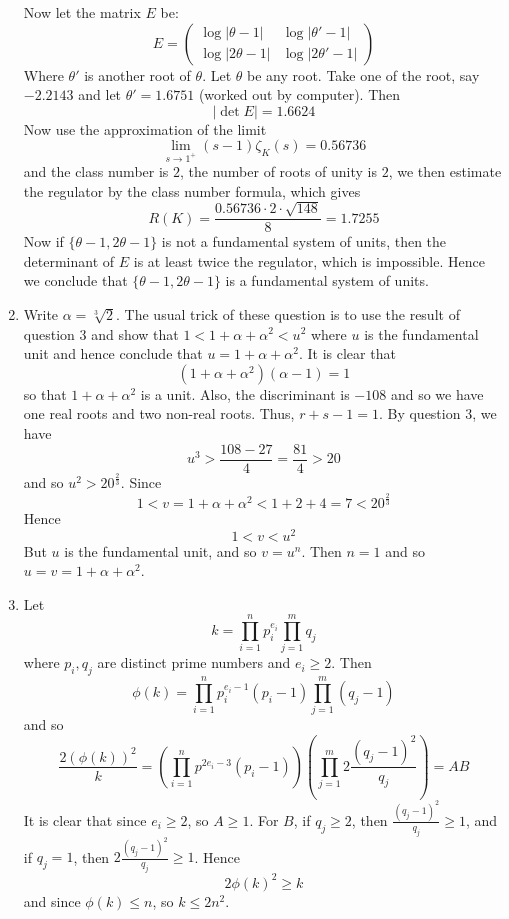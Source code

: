 \begin{enumerate}
Now let the matrix $E$ be: 
\begin{equation*} E=\begin{pmatrix} \log{|\theta-1|}&\log{|\theta'-1|}\\ \log{|2\theta-1|}&\log{|2\theta'-1|}
\end{pmatrix} \end{equation*}
Where $\theta'$ is another root of $\theta$. Let $\theta$ be any root. Take one of the root, say 
$-2.2143$ and let $\theta'=1.6751$ (worked out by computer). Then
$$|\det{E}|=1.6624$$
Now use the approximation of the limit 
$$\lim_{s \to 1^+}(s-1)\zeta_K(s)=0.56736$$
and the class number is $2$, the number of roots of unity is $2$, we then estimate the regulator by the
class number formula, which gives
$$R(K)=\frac{0.56736 \cdot 2 \cdot \sqrt{148}}{8}=1.7255$$
Now if $\{\theta-1,2\theta-1\}$ is not a fundamental system of units, then the determinant of $E$ is at least
twice the regulator, which is impossible. Hence we conclude that $\{\theta-1,2\theta-1\}$ is a 
fundamental system of units.
\item Write $\alpha=\sqrt[3]{2}$. The usual trick of these question is to use the result of question $3$ and show that $1<1+\alpha+\alpha^2<u^2$ where $u$ is the fundamental unit and hence conclude that $u=1+\alpha+\alpha^2$.
    It is clear that
    $$(1+\alpha+\alpha^2)(\alpha-1)=1$$
    so that $1+\alpha+\alpha^2$ is a unit. Also, the discriminant is $-108$ and so we have one real roots and two non-real roots. Thus, $r+s-1=1$. By question $3$, we have
    $$u^3>\frac{108-27}{4}=\frac{81}{4}>20$$
    and so $u^2>20^{\frac{2}{3}}$. Since
    $$1<v=1+\alpha+\alpha^2<1+2+4=7<20^{\frac{2}{3}}$$
    Hence
    $$1<v<u^2$$
    But $u$ is the fundamental unit, and so $v=u^n$. Then $n=1$ and so $u=v=1+\alpha+\alpha^2$.
\item Let
    $$k=\prod_{i=1}^n p^{e_i}_i \prod_{j=1}^m q_j$$
    where $p_i,q_j$ are distinct prime numbers and $e_i \ge 2$. Then
    $$\phi(k)=\prod_{i=1}^n p^{e_i-1}_i(p_i-1) \prod_{j=1}^m (q_j-1)$$
    and so
    $$\frac{2(\phi(k))^2}{k}=\left(\prod_{i=1}^n p^{2e_i-3}(p_i-1)\right)\left(\prod_{j=1}^m 2\frac{(q_j-1)^2}{q_j}\right)=AB$$
    It is clear that since $e_i \ge 2$, so $A \ge 1$. For $B$, if $q_j \ge 2$, then
    $\frac{(q_j-1)^2}{q_j}\ge 1$, and if $q_j=1$, then $2\frac{(q_j-1)^2}{q_j} \ge 1$. Hence
    $$2\phi(k)^2 \ge k$$
    and since $\phi(k) \le n$, so $k \le 2n^2$.


\end{enumerate}
